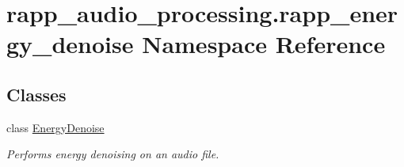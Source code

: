 \hypertarget{namespacerapp__audio__processing_1_1rapp__energy__denoise}{\section{rapp\-\_\-audio\-\_\-processing.\-rapp\-\_\-energy\-\_\-denoise Namespace Reference}
\label{namespacerapp__audio__processing_1_1rapp__energy__denoise}
}
\subsection*{Classes}
\begin{DoxyCompactItemize}
\item 
class \hyperlink{classrapp__audio__processing_1_1rapp__energy__denoise_1_1EnergyDenoise}{Energy\-Denoise}
\begin{DoxyCompactList}\small\item\em Performs energy denoising on an audio file. \end{DoxyCompactList}\end{DoxyCompactItemize}
